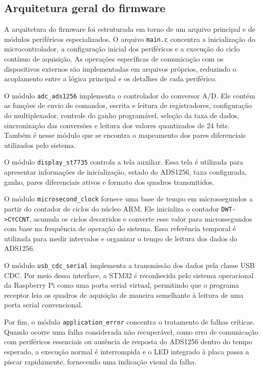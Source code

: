 \documentclass[a4paper,12pt]{fcte}
\begin{document}
\subsection{Arquitetura geral do firmware}
\label{subsec:arquitetura_firmware}

A arquitetura do firmware foi estruturada em torno de um arquivo principal e de módulos periféricos especializados. O arquivo \texttt{main.c} concentra a inicialização do microcontrolador, a configuração inicial dos periféricos e a execução do ciclo contínuo de aquisição. As operações específicas de comunicação com os dispositivos externos são implementadas em arquivos próprios, reduzindo o acoplamento entre a lógica principal e os detalhes de cada periférico.

O módulo \texttt{adc\_ads1256} implementa o controlador do conversor A/D. Ele contém as funções de envio de comandos, escrita e leitura de registradores, configuração do multiplexador, controle do ganho programável, seleção da taxa de dados, sincronização das conversões e leitura dos valores quantizados de 24 bits. Também é nesse módulo que se encontra o mapeamento dos pares diferenciais utilizados pelo sistema.

O módulo \texttt{display\_st7735} controla a tela auxiliar. Essa tela é utilizada para apresentar informações de inicialização, estado do ADS1256, taxa configurada, ganho, pares diferenciais ativos e formato dos quadros transmitidos.

O módulo \texttt{microsecond\_clock} fornece uma base de tempo em microssegundos a partir do contador de ciclos do núcleo ARM. Ele inicializa o contador \texttt{DWT->CYCCNT}, acumula os ciclos decorridos e converte esse valor para microssegundos com base na frequência de operação do sistema. Essa referência temporal é utilizada para medir intervalos e organizar o tempo de leitura dos dados do ADS1256.

O módulo \texttt{usb\_cdc\_serial} implementa a transmissão dos dados pela classe USB CDC. Por meio dessa interface, a STM32 é reconhecida pelo sistema operacional da Raspberry Pi como uma porta serial virtual, permitindo que o programa receptor leia os quadros de aquisição de maneira semelhante à leitura de uma porta serial convencional.

Por fim, o módulo \texttt{application\_error} concentra o tratamento de falhas críticas. Quando ocorre uma falha considerada não recuperável, como erro de comunicação com periféricos essenciais ou ausência de resposta do ADS1256 dentro do tempo esperado, a execução normal é interrompida e o LED integrado à placa passa a piscar rapidamente, fornecendo uma indicação visual da falha.
\end{document}
